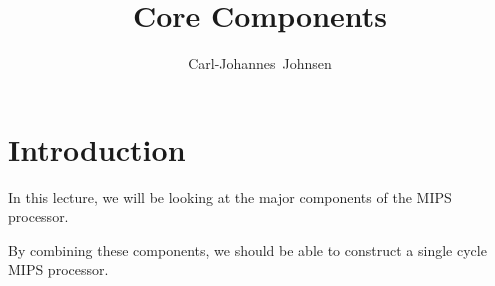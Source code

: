\documentclass{beamer}
\title{Core Components}
\author[Carl-Johannes Johnsen]{
  \mbox{Carl-Johannes Johnsen}}
\institute{Department of Computer Science\\
           University of Copenhagen}
\begin{document}
\frame{\titlepage}


\section{Introduction}
\begin{frame}
    In this lecture, we will be looking at the major components of the MIPS
    processor.

    \vspace{\baselineskip}
    By combining these components, we should be able to construct a single
    cycle MIPS processor.
\end{frame}
\end{document}
